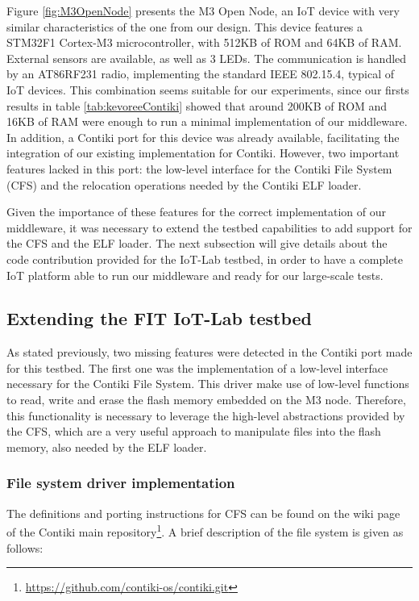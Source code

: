 Figure \ref{fig:M3OpenNode} presents the M3 Open Node, an IoT device with very similar characteristics of the one from our design.
This device features a STM32F1 Cortex-M3 microcontroller, with 512KB of ROM and 64KB of RAM.
External sensors are available, as well as 3 LEDs.
The communication is handled by an AT86RF231 radio, implementing the standard IEEE 802.15.4, typical of IoT devices.
This combination seems suitable for our experiments, since our firsts results in table \ref{tab:kevoreeContiki} showed that around 200KB of ROM and 16KB of RAM were enough to run a minimal implementation of our middleware.
In addition, a Contiki port for this device was already available, facilitating the integration of our existing implementation for Contiki.
However, two important features lacked in this port: the low-level interface for the Contiki File System (CFS) and the relocation operations needed by the Contiki ELF loader.

Given the importance of these features for the correct implementation of our middleware, it was necessary to extend the testbed capabilities to add support for the CFS and the ELF loader.
The next subsection will give details about the code contribution provided for the IoT-Lab testbed, in order to have a complete IoT platform able to run our middleware and ready for our large-scale tests.

\subsection{Extending the FIT IoT-Lab testbed}
As stated previously, two missing features were detected in the Contiki port made for this testbed.
The first one was the implementation of a low-level interface necessary for the Contiki File System.
This driver make use of low-level functions to read, write and erase the flash memory embedded on the M3 node.
Therefore, this functionality is necessary to leverage the high-level abstractions provided by the CFS, which are a very useful approach to manipulate files into the flash memory, also needed by the ELF loader.

\subsubsection{File system driver implementation}
The definitions and porting instructions for CFS can be found on the wiki page of the Contiki main repository\footnote{\url{https://github.com/contiki-os/contiki.git}}.
A brief description of the file system is given as follows:

